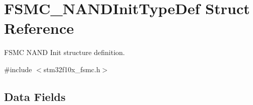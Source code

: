 \hypertarget{struct_f_s_m_c___n_a_n_d_init_type_def}{\section{F\-S\-M\-C\-\_\-\-N\-A\-N\-D\-Init\-Type\-Def Struct Reference}
\label{struct_f_s_m_c___n_a_n_d_init_type_def}
}


F\-S\-M\-C N\-A\-N\-D Init structure definition.  




{\ttfamily \#include $<$stm32f10x\-\_\-fsmc.\-h$>$}

\subsection*{Data Fields}
